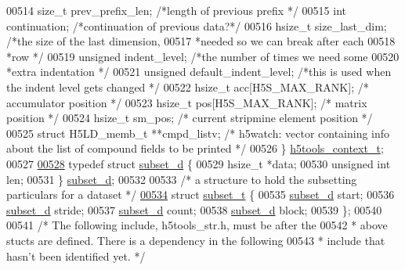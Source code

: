 \begin{DoxyCode}
{{{{{{{{{{{{{{{{{{{00514     \textcolor{keywordtype}{size\_t} prev\_prefix\_len;                  \textcolor{comment}{/*length of previous prefix */}
00515     \textcolor{keywordtype}{int}  continuation;                       \textcolor{comment}{/*continuation of previous data?*/}
00516     hsize\_t size\_last\_dim;                   \textcolor{comment}{/*the size of the last dimension,}
00517 \textcolor{comment}{                                              *needed so we can break after each}
00518 \textcolor{comment}{                                              *row */}
00519     \textcolor{keywordtype}{unsigned}  indent\_level;                \textcolor{comment}{/*the number of times we need some}
00520 \textcolor{comment}{                                       *extra indentation */}
00521     \textcolor{keywordtype}{unsigned}  default\_indent\_level;        \textcolor{comment}{/*this is used when the indent level gets changed */}
00522     hsize\_t acc[H5S\_MAX\_RANK];        \textcolor{comment}{/* accumulator position */}
00523     hsize\_t pos[H5S\_MAX\_RANK];        \textcolor{comment}{/* matrix position */}
00524     hsize\_t sm\_pos;                   \textcolor{comment}{/* current stripmine element position */}
00525     \textcolor{keyword}{struct }H5LD\_memb\_t **cmpd\_listv;  \textcolor{comment}{/* h5watch: vector containing info about the list of compound fields
       to be printed */}
00526 \} \hyperlink{structh5tools__context__t}{h5tools\_context\_t};
00527 
\hyperlink{structsubset__d}{00528} \textcolor{keyword}{typedef} \textcolor{keyword}{struct }\hyperlink{structsubset__d}{subset\_d} \{
00529     hsize\_t     *data;
00530     \textcolor{keywordtype}{unsigned} \textcolor{keywordtype}{int} len;
00531 \} \hyperlink{structsubset__d}{subset\_d};
00532 
00533 \textcolor{comment}{/* a structure to hold the subsetting particulars for a dataset */}
\hyperlink{structsubset__t}{00534} \textcolor{keyword}{struct }\hyperlink{structsubset__t}{subset\_t} \{
00535     \hyperlink{structsubset__d}{subset\_d} start;
00536     \hyperlink{structsubset__d}{subset\_d} stride;
00537     \hyperlink{structsubset__d}{subset\_d} count;
00538     \hyperlink{structsubset__d}{subset\_d} block;
00539 \};
00540 
00541 \textcolor{comment}{/* The following include, h5tools\_str.h, must be after the}
00542 \textcolor{comment}{ * above stucts are defined. There is a dependency in the following}
00543 \textcolor{comment}{ * include that hasn't been identified yet. */}
}}}}}}}}}}}}}}}}}}}
\end{DoxyCode}
